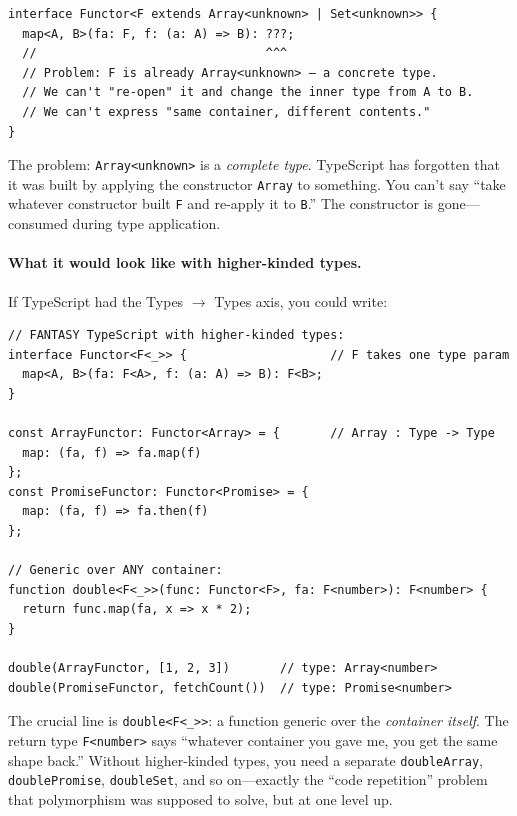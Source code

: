\documentclass[11pt,a4paper]{article}
\theoremstyle{definition}
\begin{document}
\begin{verbatim}
interface Functor<F extends Array<unknown> | Set<unknown>> {
  map<A, B>(fa: F, f: (a: A) => B): ???;
  //                                ^^^
  // Problem: F is already Array<unknown> — a concrete type.
  // We can't "re-open" it and change the inner type from A to B.
  // We can't express "same container, different contents."
}
\end{verbatim}

The problem: \texttt{Array<unknown>} is a \emph{complete type}. TypeScript has
forgotten that it was built by applying the constructor \texttt{Array} to
something. You can't say ``take whatever constructor built \texttt{F} and
re-apply it to \texttt{B}.'' The constructor is gone---consumed during type
application.

\paragraph{What it would look like with higher-kinded types.}
If TypeScript had the Types $\to$ Types axis, you could write:

\begin{verbatim}
// FANTASY TypeScript with higher-kinded types:
interface Functor<F<_>> {                    // F takes one type param
  map<A, B>(fa: F<A>, f: (a: A) => B): F<B>;
}

const ArrayFunctor: Functor<Array> = {       // Array : Type -> Type
  map: (fa, f) => fa.map(f)
};
const PromiseFunctor: Functor<Promise> = {
  map: (fa, f) => fa.then(f)
};

// Generic over ANY container:
function double<F<_>>(func: Functor<F>, fa: F<number>): F<number> {
  return func.map(fa, x => x * 2);
}

double(ArrayFunctor, [1, 2, 3])       // type: Array<number>
double(PromiseFunctor, fetchCount())  // type: Promise<number>
\end{verbatim}

The crucial line is \verb|double<F<_>>|: a function generic over the
\emph{container itself}. The return type \texttt{F<number>} says ``whatever
container you gave me, you get the same shape back.'' Without higher-kinded
types, you need a separate \texttt{doubleArray}, \texttt{doublePromise},
\texttt{doubleSet}, and so on---exactly the ``code repetition'' problem that
polymorphism was supposed to solve, but at one level up.
\end{document}
